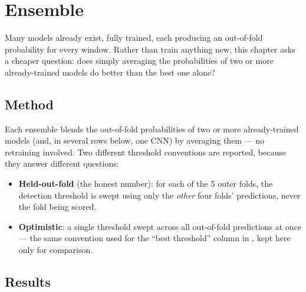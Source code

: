 \chapter{Ensemble}
\label{chap:ensemble}

Many models already exist, fully trained, each producing an out-of-fold probability for every
window. Rather than train anything new, this chapter asks a cheaper question: does simply
averaging the probabilities of two or more already-trained models do better than the best one
alone?

\section{Method}

Each ensemble blends the out-of-fold probabilities of two or more already-trained models (and,
in several rows below, one CNN) by averaging them --- no retraining involved. Two different
threshold conventions are reported, because they answer different questions:

\begin{itemize}[leftmargin=1.4em]
  \item \textbf{Held-out-fold} (the honest number): for each of the 5 outer folds, the detection
    threshold is swept using only the \emph{other} four folds' predictions, never the fold being
    scored.
  \item \textbf{Optimistic}: a single threshold swept across all out-of-fold predictions at
    once --- the same convention used for the ``best threshold'' column in
    , kept here only for comparison.
\end{itemize}

\section{Results}

